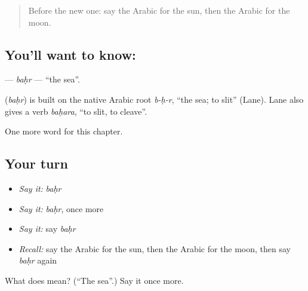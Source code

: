 \label{lesson:AR-C77-bahr}



\begin{quote}
Before the new one: say the Arabic for the sun, then the Arabic for the moon.
\end{quote}

\subsection*{You'll want to know: }
\textbf{} — \emph{baḥr} — \textquotedblleft{}the sea\textquotedblright{}.

\begin{cousinweb}
\textbf{} (\emph{baḥr}) is built on the native Arabic root \emph{b-ḥ-r}, \textquotedblleft{}the sea; to slit\textquotedblright{} (Lane). Lane also gives a verb \emph{baḥara}, \textquotedblleft{}to slit, to cleave\textquotedblright{}.
\end{cousinweb}

\begin{grammarlens}[title={What you've built}]
One more word for this chapter.
\end{grammarlens}

\subsection*{Your turn}
\begin{itemize}
\raggedright
  \item \emph{Say it:} \emph{baḥr}
  \item \emph{Say it:} \emph{baḥr}, once more
  \item \emph{Say it:} say \emph{baḥr}
  \item \emph{Recall:} say the Arabic for the sun, then the Arabic for the moon, then say \emph{baḥr} again
\end{itemize}

\begin{tcolorbox}[breakable,colback=teal!4,colframe=teal!35!black,title={Before you move on}]
What does  mean? (\textquotedblleft{}The sea\textquotedblright{}.) Say it once more.
\end{tcolorbox}
